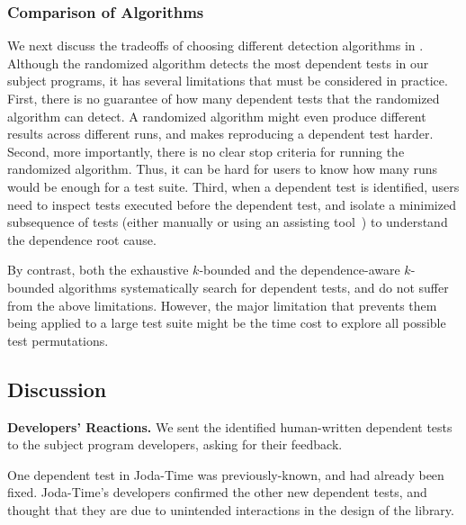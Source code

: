 \subsubsection{Comparison of Algorithms}
\label{sec:algcomparison}

We next discuss the tradeoffs of choosing different detection
algorithms in \ourtool. Although the randomized algorithm
detects the most dependent tests in our subject programs,
it has several limitations that must be considered
in practice. First, there is no guarantee of how many
dependent tests that the randomized algorithm can detect. A randomized
algorithm might even produce different results across different runs,
and makes reproducing a dependent test harder.
Second, more importantly, there is no clear stop criteria
for running the randomized algorithm.
Thus, it can be hard for users
to know how many runs would be enough for a test suite.
Third, when a dependent test is identified, users
need to inspect tests executed
before the dependent test, and isolate a minimized
subsequence of tests (either
manually or using an assisting tool~\cite{Zeller:2002}) to understand the dependence root cause.

By contrast, both the exhaustive $k$-bounded and the dependence-aware
$k$-bounded algorithms systematically search for dependent
tests, and do not suffer from the above limitations.
However, the major limitation that prevents them being applied to a
large test suite might be the time cost to
explore all possible test permutations.





\subsection{Discussion}
\label{sec:expdiscussion}


\noindent \textbf{Developers' Reactions.}
We sent the identified human-written dependent tests to the
subject program developers, asking for their feedback.

One dependent test in Joda-Time was previously-known,
and had already been fixed. Joda-Time's
developers confirmed the other new dependent
tests, and thought that they are due to unintended interactions
in the design of the library.

